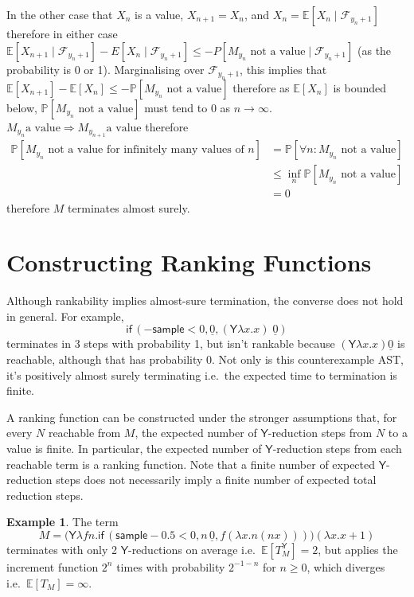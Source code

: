 \documentclass{article}
\newcommand\expect[1]{\mathbb{E}[#1]}
\newcommand{\tY}{\textsf{Y}}
\newcommand{\tif}[3]{\textsf{if}\,(#1, #2, #3)} %
\newcommand{\tsample}{\textsf{sample}}
\theoremstyle{definition}
\newtheorem{example}{Example}
\theoremstyle{lemma}
\theoremstyle{remark}
\begin{document}
In the other case that $X_n$ is a value, $X_{n+1} = X_n$, and $X_n = \mathbb E[X_n \mid \mathcal F_{y_n+1}]$ therefore in either case $\mathbb E[X_{n+1} \mid \mathcal F_{y_n+1}] - E[X_n \mid \mathcal F_{y_n+1}] \leq \mathbb -P[M_{y_n} \text{ not a value} \mid \mathcal F_{y_n+1}]$ (as the probability is 0 or 1). Marginalising over $\mathcal F_{y_n+1}$, this implies that $\mathbb{E}[X_{n+1}] - \mathbb{E}[X_{n}] \leq -\mathbb P[M_{y_n} \text{ not a value}]$ therefore as $\mathbb{E}[X_n]$ is bounded below, $\mathbb P[M_{y_n} \text{ not a value}]$ must tend to 0 as $n \to \infty$. $M_{y_n} \text{a value} \Rightarrow M_{y_{n+1}} \text{a value}$ therefore 
\begin{align*}
\mathbb P[M_{y_n} \text{ not a value for infinitely many values of $n$}]  
& = \mathbb P[\forall n: M_{y_n} \text{ not a value}] \\
& \leq \inf_n \mathbb P[M_{y_n} \text{ not a value}] \\
& = 0
\end{align*} 
therefore $M$ terminates almost surely.



\section{Constructing Ranking Functions}
Although rankability implies almost-sure termination, the converse does not hold in general. For example,
\begin{equation}
\tif{{-}\tsample < 0}{\underline{0}}{(\tY \lambda x. x) \; \underline 0}
\label{ex:0 probability reachable}
\end{equation}
terminates in 3 steps with probability 1, but isn't rankable because $(\tY \lambda x. x) \underline 0$ is reachable, although that has probability 0. 
Not only is this counterexample AST, it's positively almost surely terminating i.e.~the expected time to termination is finite.

A ranking function can be constructed under the stronger assumptions that, for every $N$ reachable from $M$, the expected number of $\tY$-reduction steps from $N$ to a value is finite. In particular, the expected number of $\tY$-reduction steps from each reachable term is a ranking function. Note that a finite number of expected $\tY$-reduction steps does not necessarily imply a finite number of expected total reduction steps.

\begin{example}
\label{ex:tY finite does not imply t finite}
The term
\[
M = \big(\tY \lambda f n. \tif{\tsample - 0.5 < 0}{n \, \underline 0}{f (\lambda x. n (n x))}\big) (\lambda x. x+1)
\] 
terminates with only 2 $\tY$-reductions on average i.e.~$\expect{T_M^\tY} = 2$, but applies the increment function $2^n$ times with probability $2^{-1-n}$ for $n \geq 0$, which diverges i.e.~$\expect{T_M} = \infty$.
\end{example}
\end{document}

